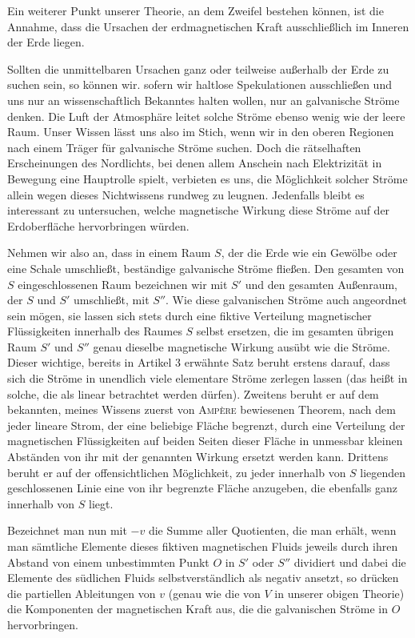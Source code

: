 Ein weiterer Punkt unserer Theorie, an dem Zweifel bestehen können, ist die Annahme, dass die Ursachen der erdmagnetischen Kraft ausschließlich im Inneren der Erde liegen.

Sollten die unmittelbaren Ursachen ganz oder teilweise außerhalb der Erde zu suchen sein, so können wir. sofern wir haltlose Spekulationen ausschließen und uns nur an wissenschaftlich Bekanntes halten wollen, nur an galvanische Ströme denken. Die Luft der Atmosphäre leitet solche Ströme ebenso wenig wie der leere Raum. Unser Wissen lässt uns also im Stich, wenn wir in den oberen Regionen nach einem Träger für galvanische Ströme suchen. Doch die rätselhaften Erscheinungen des Nordlichts, bei denen allem Anschein nach Elektrizität in Bewegung eine Hauptrolle spielt, verbieten es uns, die Möglichkeit solcher Ströme allein wegen dieses Nichtwissens rundweg zu leugnen. Jedenfalls bleibt es interessant zu untersuchen, welche magnetische Wirkung diese Ströme auf der Erdoberfläche hervorbringen würden.

Nehmen wir also an, dass in einem Raum $S$, der die Erde wie ein Gewölbe oder eine Schale umschließt, beständige galvanische Ströme fließen. Den gesamten von $S$ eingeschlossenen Raum bezeichnen wir mit $S'$ und den gesamten Außenraum, der $S$ und $S'$ umschließt, mit $S''$. Wie diese galvanischen Ströme auch angeordnet sein mögen, sie lassen sich stets durch eine fiktive Verteilung magnetischer Flüssigkeiten innerhalb des Raumes $S$ selbst ersetzen, die im gesamten übrigen Raum $S'$ und $S''$ genau dieselbe magnetische Wirkung ausübt wie die Ströme. Dieser wichtige, bereits in Artikel 3 erwähnte Satz beruht erstens darauf, dass sich die Ströme in unendlich viele elementare Ströme zerlegen lassen (das heißt in solche, die als linear betrachtet werden dürfen). Zweitens beruht er auf dem bekannten, meines Wissens zuerst von \textsc{Ampère} bewiesenen Theorem, nach dem jeder lineare Strom, der eine beliebige Fläche begrenzt, durch eine Verteilung der magnetischen Flüssigkeiten auf beiden Seiten dieser Fläche in unmessbar kleinen Abständen von ihr mit der genannten Wirkung ersetzt werden kann. Drittens beruht er auf der offensichtlichen Möglichkeit, zu jeder innerhalb von $S$ liegenden geschlossenen Linie eine von ihr begrenzte Fläche anzugeben, die ebenfalls ganz innerhalb von $S$ liegt.

Bezeichnet man nun mit $-v$ die Summe aller Quotienten, die man erhält, wenn man sämtliche Elemente dieses fiktiven magnetischen Fluids jeweils durch ihren Abstand von einem unbestimmten Punkt $O$ in $S'$ oder $S''$ dividiert und dabei die Elemente des südlichen Fluids selbstverständlich als negativ ansetzt, so drücken die partiellen Ableitungen von $v$ (genau wie die von $V$ in unserer obigen Theorie) die Komponenten der magnetischen Kraft aus, die die galvanischen Ströme in $O$ hervorbringen.

